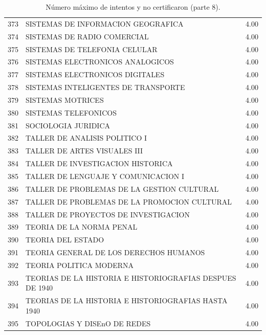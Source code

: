 \documentclass[12pt]{article}
\begin{document}
\begin{table}[ht]
{\begin{tabular}{rlr}
  373 & SISTEMAS DE INFORMACION GEOGRAFICA & 4.00 \\ 
  374 & SISTEMAS DE RADIO COMERCIAL & 4.00 \\ 
  375 & SISTEMAS DE TELEFONIA CELULAR & 4.00 \\ 
  376 & SISTEMAS ELECTRONICOS ANALOGICOS & 4.00 \\ 
  377 & SISTEMAS ELECTRONICOS DIGITALES & 4.00 \\ 
  378 & SISTEMAS INTELIGENTES DE TRANSPORTE & 4.00 \\ 
  379 & SISTEMAS MOTRICES & 4.00 \\ 
  380 & SISTEMAS TELEFONICOS & 4.00 \\ 
  381 & SOCIOLOGIA JURIDICA & 4.00 \\ 
  382 & TALLER DE ANALISIS POLITICO I & 4.00 \\ 
  383 & TALLER DE ARTES VISUALES III & 4.00 \\ 
  384 & TALLER DE INVESTIGACION HISTORICA & 4.00 \\ 
  385 & TALLER DE LENGUAJE Y COMUNICACION I & 4.00 \\ 
  386 & TALLER DE PROBLEMAS DE LA GESTION CULTURAL & 4.00 \\ 
  387 & TALLER DE PROBLEMAS DE LA PROMOCION CULTURAL & 4.00 \\ 
  388 & TALLER DE PROYECTOS DE INVESTIGACION & 4.00 \\ 
  389 & TEORIA DE LA NORMA PENAL & 4.00 \\ 
  390 & TEORIA DEL ESTADO & 4.00 \\ 
  391 & TEORIA GENERAL DE LOS DERECHOS HUMANOS & 4.00 \\ 
  392 & TEORIA POLITICA MODERNA & 4.00 \\ 
  393 & TEORIAS DE LA HISTORIA E HISTORIOGRAFIAS DESPUES DE 1940 & 4.00 \\ 
  394 & TEORIAS DE LA HISTORIA E HISTORIOGRAFIAS HASTA 1940 & 4.00 \\ 
  395 & TOPOLOGIAS Y DISEnO DE REDES & 4.00 \\ 
   \hline
\end{tabular}}
\caption{\label{Num_Max_Intentos_Nunca_Cert_8} N\'umero m\'aximo de intentos y no certificaron (parte 8).}
\end{table}
\end{document}
